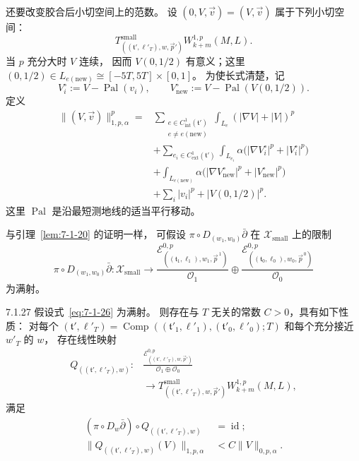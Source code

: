 还要改变胶合后小切空间上的范数。
设 $(0,V,\vec v)=(V,\vec v)$
属于下列小切空间：
\[
T^{\mathrm{small}}_{((\mathfrak t',\ell'_T),w,\vec p')}
W_{k+m}^{1,p}(M,L).
\]
当 $p$ 充分大时 $V$ 连续，
因而 $V(0,1/2)$ 有意义；这里
$(0,1/2)\in L_{e(\mathrm{new})}
\cong[-5T,5T]\times[0,1]$。
为使长式清楚，记
\[
V_i^\circ:=V-\operatorname{Pal}(v_i),
\qquad
V_{\mathrm{new}}^\circ
:=V-\operatorname{Pal}(V(0,1/2)).
\]
定义
\[
\begin{aligned}
\|(V,\vec v)\|_{1,p,\alpha}^p
={}&\sum_{\substack{e\in C^1_{\mathrm{int}}(\mathfrak t')\\
                       e\ne e(\mathrm{new})}}
\int_{L_e}(|\nabla V|+|V|)^p\\
&+\sum_{e_i\in C^1_{\mathrm{ext}}(\mathfrak t')}
\int_{L_{e_i}}\alpha
\bigl(|\nabla V_i^\circ|^p+|V_i^\circ|^p\bigr)\\
&+\int_{L_{e(\mathrm{new})}}\alpha
\bigl(|\nabla V_{\mathrm{new}}^\circ|^p
      +|V_{\mathrm{new}}^\circ|^p\bigr)\\
&+\sum_i|v_i|^p+|V(0,1/2)|^p.
\end{aligned}
\]
这里 $\operatorname{Pal}$ 是沿最短测地线的适当平行移动。

与引理~\ref{lem:7-1-20} 的证明一样，
可假设 $\pi\circ D_{(w_1,w_0)}\bar\partial$
在 $\mathcal X_{\mathrm{small}}$ 上的限制
\begin{equation}
\pi\circ D_{(w_1,w_0)}\bar\partial\colon
\mathcal X_{\mathrm{small}}
\longrightarrow
\frac{\mathcal E^{0,p}_{((\mathfrak t_1,\ell_1),w_1,\vec p^{\,1})}}
{\mathcal O_1}
\oplus
\frac{\mathcal E^{0,p}_{((\mathfrak t_0,\ell_0),w_0,\vec p^{\,0})}}
{\mathcal O_0}
\tag{7.1.26}\label{eq:7-1-26}
\end{equation}
为满射。

\begin{proposition}{7.1.27}\label{prop:7-1-27}
假设式~\eqref{eq:7-1-26} 为满射。
则存在与 $T$ 无关的常数 $C>0$，具有如下性质：
对每个
$(\mathfrak t',\ell'_T)
=\operatorname{Comp}((\mathfrak t'_1,\ell'_1),
(\mathfrak t'_0,\ell'_0);T)$
和每个充分接近 $w'_T$ 的 $w$，
存在线性映射
\[
\begin{aligned}
Q_{((\mathfrak t',\ell'_T),w)}\colon
&\frac{\mathcal E^{0,p}_{((\mathfrak t',\ell'_T),w,\vec p')}}
{\mathcal O_1\oplus\mathcal O_0}\\
&\longrightarrow
T^{\mathrm{small}}_{((\mathfrak t',\ell'_T),w,\vec p')}
W_{k+m}^{1,p}(M,L),
\end{aligned}
\]
满足
\begin{align}
(\pi\circ D_w\bar\partial)
\circ Q_{((\mathfrak t',\ell'_T),w)}
&=\operatorname{id};
\tag{7.1.28.1}\label{eq:7-1-28-1}\\
\bigl\|Q_{((\mathfrak t',\ell'_T),w)}(V)\bigr\|_{1,p,\alpha}
&<C\|V\|_{0,p,\alpha}.
\tag{7.1.28.2}\label{eq:7-1-28-2}
\end{align}
\end{proposition}

